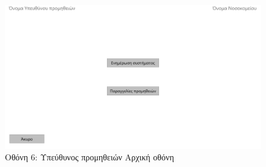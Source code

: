\documentclass[12pt,a4paper,oneside]{article}
\begin{document}
\begin{figure}[h!]
\centering
\includegraphics[width=1.1\textwidth]{Υπεύθυνος προμηθειών Αρχική οθόνη.pdf}
\captionsetup{labelformat=empty}
\caption{Οθόνη 6: Υπεύθυνος προμηθειών Αρχική οθόνη}
\end{figure}



\end{document}
